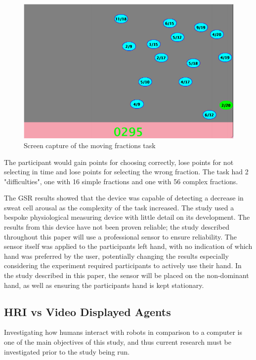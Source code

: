 \documentclass[conference]{IEEEtran}
\begin{document}
\begin{figure}[h!]
    \centering
    \includegraphics[width=0.95\linewidth]{figures/ScreenCaptureFractions.PNG}
    \caption{Screen capture of the moving fractions task \cite{ikehara2005assessing}}
    \label{fig:MovingfracitonsTask}
\end{figure}

The participant would gain points for choosing correctly, lose points for not selecting in time and lose points for selecting the wrong fraction. The task had 2 "difficulties", one with 16 simple fractions and one with 56 complex fractions.

The GSR results showed that the device was capable of detecting a decrease in sweat cell arousal as the complexity of the task increased. The study used a bespoke physiological measuring device with little detail on its development. The results from this device have not been proven reliable; the study described throughout this paper will use a professional sensor to ensure reliability. The sensor itself was applied to the participants left hand, with no indication of which hand was preferred by the user, potentially changing the results especially considering the experiment required participants to actively use their hand. In  the study described in this paper, the sensor will be placed on the non-dominant hand, as well as ensuring the participants hand is kept stationary.

\subsection{HRI vs Video Displayed Agents}
Investigating how humans interact with robots in comparison to a computer is one of the main objectives of this study, and thus current research must be investigated prior to the study being run. \newline
\end{document}
